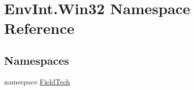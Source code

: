 \hypertarget{namespace_env_int_1_1_win32}{}\section{Env\+Int.\+Win32 Namespace Reference}
\label{namespace_env_int_1_1_win32}
\subsection*{Namespaces}
\begin{DoxyCompactItemize}
\item 
namespace \hyperlink{namespace_env_int_1_1_win32_1_1_field_tech}{Field\+Tech}
\end{DoxyCompactItemize}
